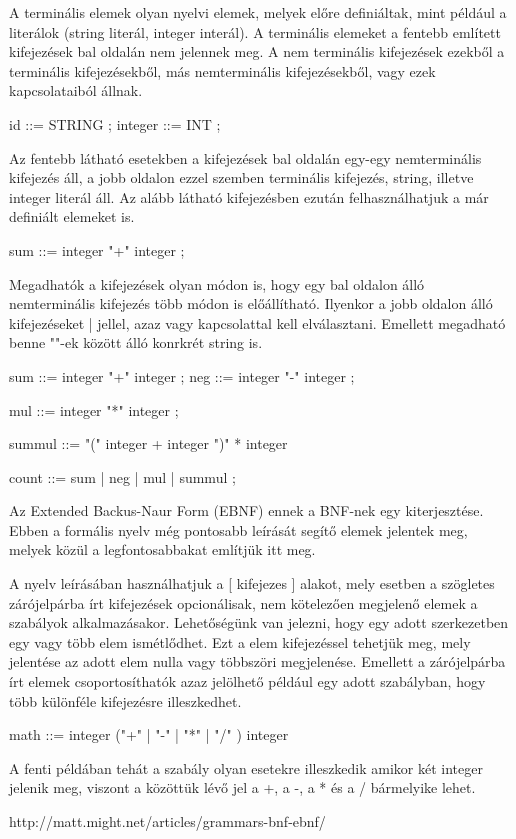 A terminális elemek olyan nyelvi elemek, melyek előre definiáltak, mint például a literálok (string literál, integer interál). A terminális elemeket a fentebb említett kifejezések bal oldalán nem jelennek meg.
A nem terminális kifejezések ezekből a terminális kifejezésekből, más nemterminális kifejezésekből, vagy ezek kapcsolataiból állnak.

id ::= 	STRING
	;
integer ::= INT
	;

Az fentebb látható esetekben a kifejezések bal oldalán egy-egy nemterminális kifejezés áll, a jobb oldalon ezzel szemben terminális kifejezés, string, illetve integer literál áll. Az alább látható kifejezésben ezután felhasználhatjuk a már definiált elemeket is.

sum ::=	integer "+" integer
	;

Megadhatók a kifejezések olyan módon is, hogy egy bal oldalon álló nemterminális kifejezés több módon is előállítható. Ilyenkor a jobb oldalon álló kifejezéseket | jellel, azaz vagy kapcsolattal kell elválasztani. Emellett megadható benne ""-ek között álló konrkrét string is.

sum ::= integer "+" integer
	;
neg ::= integer "-" integer
	;
	
mul ::= integer "*" integer
	;

summul ::= "(" integer + integer ")" * integer

count ::= sum 
	| neg
	| mul
	| summul
	;
	
Az Extended Backus-Naur Form (EBNF) ennek a BNF-nek egy kiterjesztése. Ebben a formális nyelv még pontosabb leírását segítő elemek jelentek meg, melyek közül a legfontosabbakat említjük itt meg.

A nyelv leírásában használhatjuk a [ kifejezes ] alakot, mely esetben a szögletes zárójelpárba írt kifejezések opcionálisak, nem kötelezően megjelenő elemek a szabályok alkalmazásakor.
Lehetőségünk van jelezni, hogy egy adott szerkezetben egy vagy több elem ismétlődhet. Ezt a { elem } kifejezéssel tehetjük meg, mely jelentése az adott elem nulla vagy többszöri megjelenése.
Emellett a zárójelpárba írt elemek csoportosíthatók azaz jelölhető például egy adott szabályban, hogy több különféle kifejezésre illeszkedhet.

math ::= integer ("+" | "-" | "*" | "/" ) integer

A fenti példában tehát a szabály olyan esetekre illeszkedik amikor két integer jelenik meg, viszont a közöttük lévő jel a +, a -, a * és a / bármelyike lehet.

http://matt.might.net/articles/grammars-bnf-ebnf/

